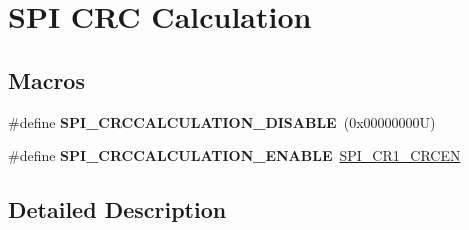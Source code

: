 \hypertarget{group___s_p_i___c_r_c___calculation}{}\section{S\+PI C\+RC Calculation}
\label{group___s_p_i___c_r_c___calculation}
\subsection*{Macros}
\begin{DoxyCompactItemize}
\item 
\mbox{\label{group___s_p_i___c_r_c___calculation_ga9cd586b66473d7f207103a443280820e}} 
\#define {\bfseries S\+P\+I\+\_\+\+C\+R\+C\+C\+A\+L\+C\+U\+L\+A\+T\+I\+O\+N\+\_\+\+D\+I\+S\+A\+B\+LE}~(0x00000000\+U)
\item 
\mbox{\label{group___s_p_i___c_r_c___calculation_ga431d368997c9c41e8923cbcd41b00123}} 
\#define {\bfseries S\+P\+I\+\_\+\+C\+R\+C\+C\+A\+L\+C\+U\+L\+A\+T\+I\+O\+N\+\_\+\+E\+N\+A\+B\+LE}~\hyperlink{group___peripheral___registers___bits___definition_gac9339b7c6466f09ad26c26b3bb81c51b}{S\+P\+I\+\_\+\+C\+R1\+\_\+\+C\+R\+C\+EN}
\end{DoxyCompactItemize}


\subsection{Detailed Description}
